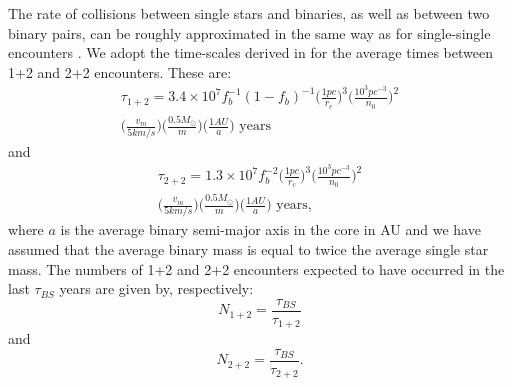 The rate of collisions
between single stars and binaries, as well as between two
binary pairs, can be roughly approximated in the same way
as for single-single encounters \citep{leonard89, sigurdsson93,
  bacon96, fregeau04}.  We adopt the time-scales derived in
\citet{leigh11b} for the average times between 1+2 and 2+2 encounters.
These are:
\begin{equation}
\begin{gathered}
\label{eqn:coll1+25}
\tau_{1+2} = 3.4 \times 10^7f_b^{-1}(1-f_b)^{-1}\Big(\frac{1 pc}{r_c}
\Big)^3 \Big(\frac{10^3 pc^{-3}}{n_0} \Big)^2 \\
 \Big(\frac{v_{m}}{5
  km/s} \Big) \Big(\frac{0.5 M_{\odot}}{m} \Big) \Big(\frac{1 AU}{a}
\Big)\mbox{ years}
\end{gathered}
\end{equation}
and
\begin{equation}
\begin{gathered}
\label{eqn:coll2+25}
\tau_{2+2} = 1.3 \times 10^7f_b^{-2}\Big(\frac{1 pc}{r_c}
\Big)^3 \Big(\frac{10^3 pc^{-3}}{n_0} \Big)^2 \\ 
\Big(\frac{v_{m}}{5
  km/s} \Big) \Big(\frac{0.5 M_{\odot}}{m} \Big) \Big(\frac{1 AU}{a}
\Big)\mbox{ years},
\end{gathered}
\end{equation}
where $a$ is the average binary semi-major axis in the core in AU and
we have assumed that the average binary mass is equal to twice the
average single star mass.  
The numbers of 1+2 and 2+2 encounters expected to have occurred in the 
last $\tau_{BS}$ years are given by, respectively:
\begin{equation}
\label{eqn:N-1+2}
N_{1+2} = \frac{\tau_{BS}}{\tau_{1+2}}
\end{equation}
and
\begin{equation}
\label{eqn:N-2+2}
N_{2+2} = \frac{\tau_{BS}}{\tau_{2+2}}.
\end{equation}

